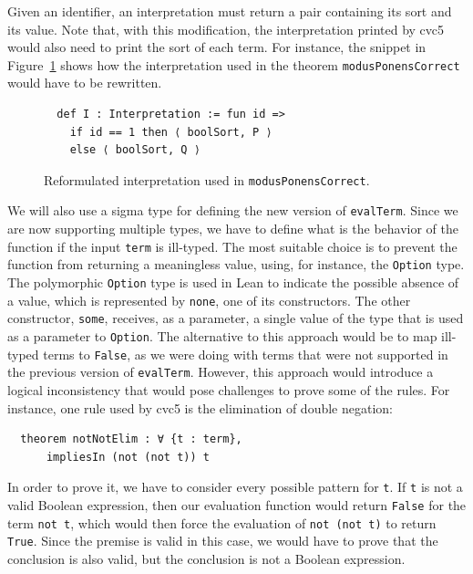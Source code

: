 Given an identifier, an interpretation must return a pair containing its sort
and its value. Note that, with this modification, the interpretation printed
by cvc5 would also need to print the sort of each term. For instance,
the snippet in Figure~\ref{fig:new_interp} shows how the interpretation
used in the theorem \texttt{modusPonensCorrect} would have to be rewritten.

\begin{figure}[t]
\begin{verbatim}
  def I : Interpretation := fun id =>
    if id == 1 then ⟨ boolSort, P ⟩
    else ⟨ boolSort, Q ⟩
\end{verbatim}
\caption{Reformulated interpretation used in \texttt{modusPonensCorrect}.}\label{fig:new_interp}
\end{figure}

We will also use a sigma type for defining the new version of \texttt{evalTerm}.
%
Since we are now supporting multiple types, we have to define what is the behavior
of the function if the input \texttt{term} is ill-typed.
The most suitable choice is to prevent the function from returning
a meaningless value, using, for instance, the \texttt{Option} type. The polymorphic
\texttt{Option} type is used in Lean to indicate the possible absence of a value,
which is represented by \texttt{none}, one of its constructors. The other
constructor, \texttt{some}, receives, as a parameter, a single value
of the type that is used as a parameter to \texttt{Option}.
The alternative to this approach would be to map ill-typed
terms to \texttt{False}, as we were doing with terms that were not supported
in the previous version of \texttt{evalTerm}.
However, this approach would introduce
a logical inconsistency that would pose challenges to prove some of the rules.
For instance, one rule used by cvc5 is the elimination of double negation:

\begin{verbatim}
  theorem notNotElim : ∀ {t : term},
      impliesIn (not (not t)) t
\end{verbatim}

In order to prove it, we have to consider every possible pattern for \texttt{t}.
If \texttt{t} is not a valid Boolean expression, then our evaluation function would
return \texttt{False} for the term \texttt{not t}, which would then force the
evaluation of \texttt{not (not t)} to return \texttt{True}. Since the premise
is valid in this case, we would have to prove that the conclusion is also valid,
but the conclusion is not a Boolean expression.


